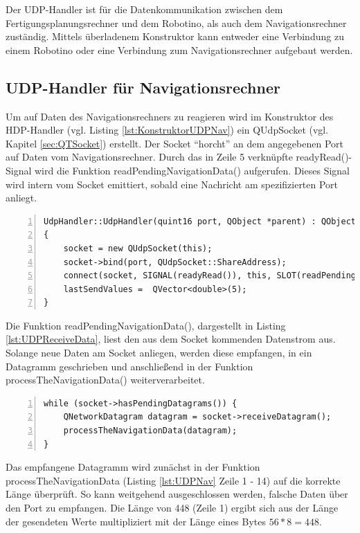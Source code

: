 Der UDP-Handler ist für die Datenkommunikation zwischen dem Fertigungsplanungsrechner und dem Robotino, als auch dem Navigationsrechner zuständig. Mittels überladenem Konstruktor kann entweder eine Verbindung zu einem Robotino oder eine Verbindung zum Navigationsrechner aufgebaut werden. 

\subsection{UDP-Handler für Navigationsrechner}

Um auf Daten des Navigationsrechners zu reagieren wird im Konstruktor des HDP-Handler (vgl. Listing \ref{lst:KonstruktorUDPNav}) ein QUdpSocket (vgl. Kapitel \ref{sec:QTSocket}) erstellt. Der Socket "`horcht"' an dem angegebenen Port auf Daten vom Navigationsrechner. Durch das in Zeile 5 verknüpfte readyRead()-Signal wird die Funktion readPendingNavigationData() aufgerufen. Dieses Signal wird intern vom Socket emittiert, sobald eine Nachricht am spezifizierten Port anliegt. 

\begin{lstlisting}[frame=single, breaklines=true, numbers=left, stepnumber=2, firstnumber=1, numberstyle = \tiny, caption=UDP-Handler Konstruktor für Navigationsdatenaustausch,label=lst:KonstruktorUDPNav]
UdpHandler::UdpHandler(quint16 port, QObject *parent) : QObject(parent)
{
    socket = new QUdpSocket(this);
    socket->bind(port, QUdpSocket::ShareAddress);
    connect(socket, SIGNAL(readyRead()), this, SLOT(readPendingNavigationData()));
    lastSendValues =  QVector<double>(5);
}
\end{lstlisting}

Die Funktion readPendingNavigationData(), dargestellt in Listing \ref{lst:UDPReceiveData}, liest den aus dem Socket kommenden Datenstrom aus. Solange neue Daten am Socket anliegen, werden diese empfangen, in ein Datagramm geschrieben und anschließend in der Funktion processTheNavigationData() weiterverarbeitet. 

\begin{lstlisting}[frame=single, breaklines=true, numbers=left, stepnumber=2, firstnumber=1, numberstyle = \tiny, caption=Daten über UDP empfangen,label=lst:UDPReceiveData]
while (socket->hasPendingDatagrams()) {
    QNetworkDatagram datagram = socket->receiveDatagram();
    processTheNavigationData(datagram);
}
\end{lstlisting}

Das empfangene Datagramm wird zunächst in der Funktion processTheNavigationData (Listing \ref{lst:UDPNav} Zeile 1 - 14) auf die korrekte Länge überprüft. So kann weitgehend ausgeschlossen werden, falsche Daten über den Port zu empfangen. Die Länge von 448 (Zeile 1) ergibt sich aus der Länge der gesendeten Werte multipliziert mit der Länge eines Bytes $56 * 8 = 448$. 

